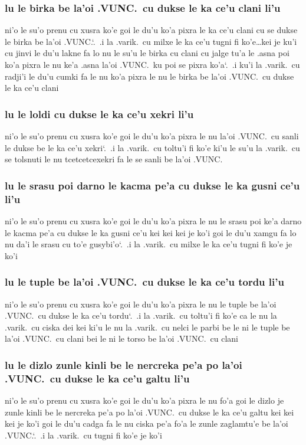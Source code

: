 \documentclass{report}
\newcommand\sds{\spacefactor\sfcode`.\ \space}
\begin{document}
\subsubsection{lu le birka be la'oi .VUNC.\ cu dukse le ka ce'u clani li'u}
ni'o le su'o prenu cu xusra ko'e goi le du'u ko'a pixra le ka ce'u clani cu se dukse le birka be la'oi .VUNC.\sds  .i la .varik.\ cu milxe le ka ce'u tugni fi ko'e\ldots kei je ku'i cu jinvi le du'u lakne fa lo nu le su'u le birka cu clani cu jalge tu'a le .asna poi ko'a pixra le nu ke'a .asna la'oi .VUNC.\ ku poi se pixra ko'a\sds  .i ku'i la .varik.\ cu radji'i le du'u cumki fa le nu ko'a pixra le nu le birka be la'oi .VUNC.\ cu dukse le ka ce'u clani

\subsubsection{lu le loldi cu dukse le ka ce'u xekri li'u}
ni'o le su'o prenu cu xusra ko'e goi le du'u ko'a pixra le nu la'oi .VUNC.\ cu sanli le dukse be le ka ce'u xekri\sds  .i la .varik.\ cu toltu'i fi ko'e ki'u le su'u la .varik.\ cu se tolsnuti le nu tcetcetcexekri fa le se sanli be la'oi .VUNC.

\subsubsection{lu le srasu poi darno le kacma pe'a cu dukse le ka gusni ce'u li'u}
ni'o le su'o prenu cu xusra ko'e goi le du'u ko'a pixra le nu le srasu poi ke'a darno le kacma pe'a cu dukse le ka gusni ce'u kei kei kei je ko'i goi le du'u xamgu fa lo nu da'i le srasu cu to'e gusybi'o\sds  .i la .varik.\ cu milxe le ka ce'u tugni fi ko'e je ko'i

\subsubsection{lu le tuple be la'oi .VUNC.\ cu dukse le ka ce'u tordu li'u}
ni'o le su'o prenu cu xusra ko'e goi le du'u ko'a pixra le nu le tuple be la'oi .VUNC.\ cu dukse le ka ce'u tordu\sds  .i la .varik.\ cu toltu'i fi ko'e ca le nu la .varik.\ cu ciska dei kei ki'u le nu la .varik.\ cu nelci le parbi be le ni le tuple be la'oi .VUNC.\ cu clani bei le ni le torso be la'oi .VUNC.\ cu clani

\subsubsection{lu le dizlo zunle kinli be le nercreka pe'a po la'oi .VUNC.\ cu dukse le ka ce'u galtu li'u}
ni'o le su'o prenu cu xusra ko'e goi le du'u ko'a pixra le nu fo'a goi le dizlo je zunle kinli be le nercreka pe'a po la'oi .VUNC.\ cu dukse le ka ce'u galtu kei kei kei je ko'i goi le du'u cadga fa le nu ciska pe'a fo'a le zunle zaglamtu'e be la'oi .VUNC.\sds  .i la .varik.\ cu tugni fi ko'e je ko'i
\end{document}
